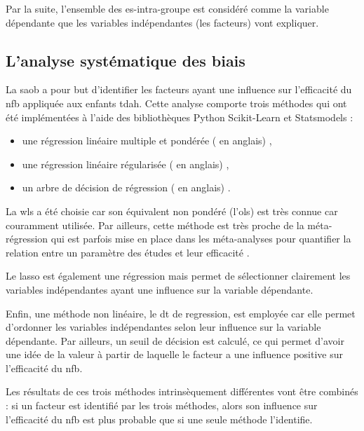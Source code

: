 Par la suite, l'ensemble des \gls{es}-intra-groupe est considéré comme la variable dépendante que les variables indépendantes (les facteurs) vont expliquer. 

\subsection{L'analyse systématique des biais} \label{saob_method}

La \gls{saob} a pour but d'identifier les facteurs ayant une influence sur l'efficacité du \gls{nfb} appliquée aux enfants \gls{tdah}. 
Cette analyse comporte trois méthodes qui ont été implémentées à l'aide des bibliothèques Python Scikit-Learn \citep[version 0.18.1]{Pedregosa2011} et Statsmodels \citep[version 0.8.0]{Seabold2010} : 
\begin{itemize}
    \item une régression linéaire multiple et pondérée ( en anglais) \citep{Montgomery2012},
	  \item une régression linéaire régularisée ( en anglais) \citep{Tibshirani1996},
	  \item un arbre de décision de régression ( en anglais) \citep{Quinlan1986}.
\end{itemize}

La \gls{wls} a été choisie car son équivalent non pondéré (l'\gls{ols}) est très connue car couramment utilisée. Par ailleurs, cette méthode est très proche de la méta-régression qui est 
parfois mise en place dans les méta-analyses pour quantifier la relation entre un paramètre des études et leur efficacité \citep{Cortese2016, Borenstein2009}. 

Le \gls{lasso} est également une régression mais permet de sélectionner clairement les variables indépendantes ayant une influence sur la variable dépendante. 

Enfin, une méthode non linéaire, le \gls{dt} de regression, est employée car elle permet d'ordonner les variables indépendantes selon leur influence sur la variable dépendante. 
Par ailleurs, un seuil de décision est calculé, ce qui permet d'avoir une idée de la valeur à partir de laquelle le facteur a une influence positive sur l'efficacité du \gls{nfb}.

Les résultats de ces trois méthodes intrinsèquement différentes vont être combinés : si un facteur est identifié par les trois méthodes, alors son influence sur l'efficacité du 
\gls{nfb} est plus probable que si une seule méthode l'identifie. 

